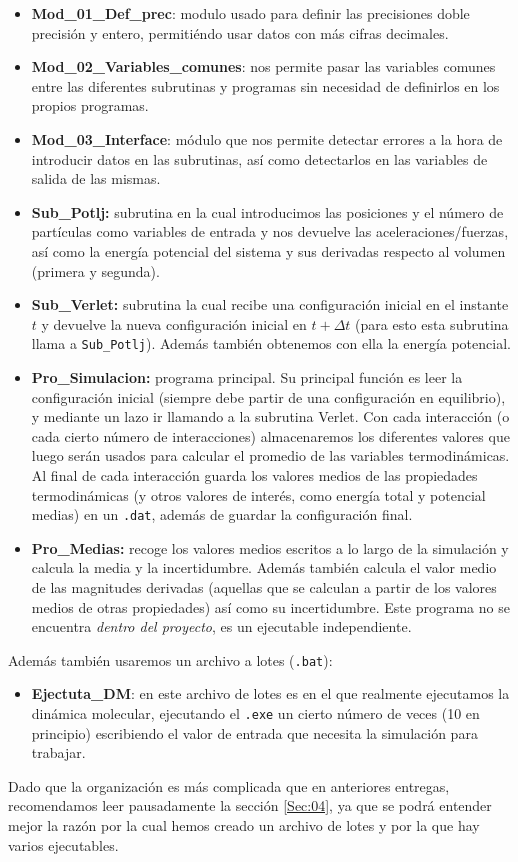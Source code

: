 \documentclass[11pt]{article} %
\begin{document}
\begin{itemize}
	\item \textbf{Mod\_01\_Def\_prec}: modulo usado para definir las precisiones doble precisión y entero, permitiéndo usar datos con más cifras decimales.
	\item \textbf{Mod\_02\_Variables\_comunes}: nos permite pasar las variables comunes entre las diferentes subrutinas y programas sin necesidad de definirlos en los propios programas.
	\item \textbf{Mod\_03\_Interface}: módulo que nos permite detectar errores a la hora de introducir datos en las subrutinas, así como detectarlos en las variables de salida de las mismas.
	\item \textbf{Sub\_Potlj:} subrutina en la cual introducimos las posiciones y el número de partículas como variables de entrada y nos devuelve las aceleraciones/fuerzas, así como la energía potencial del sistema y sus derivadas respecto al volumen (primera y segunda).
	\item \textbf{Sub\_Verlet:} subrutina la cual recibe una configuración inicial en el instante $t$ y devuelve la nueva configuración inicial en $t+\Delta t$ (para esto esta subrutina llama a \texttt{Sub\_Potlj}). Además también obtenemos con ella la energía potencial.
	\item \textbf{Pro\_Simulacion:} programa principal. Su principal función es leer la configuración inicial (siempre debe partir de una configuración en equilibrio), y mediante un lazo ir llamando a la subrutina Verlet. Con cada interacción (o cada cierto número de interacciones) almacenaremos los diferentes valores que luego serán usados para calcular el promedio de las variables termodinámicas. Al final de cada interacción guarda los valores medios de las propiedades termodinámicas (y otros valores de interés, como energía total y potencial medias) en un \texttt{.dat}, además de guardar la configuración final.
	\item \textbf{Pro\_Medias:} recoge los valores medios escritos a lo largo de la simulación y calcula la media y la incertidumbre. Además también calcula el valor medio de las magnitudes derivadas (aquellas que se calculan a partir de los valores medios de otras propiedades) así como su incertidumbre. Este programa no se encuentra \textit{dentro del proyecto}, es un ejecutable independiente.
\end{itemize}
Además también usaremos un archivo a lotes (\texttt{.bat}):

\begin{itemize}
	\item \textbf{Ejectuta\_DM}: en este archivo de lotes es en el que realmente ejecutamos la dinámica molecular, ejecutando el \texttt{.exe} un cierto número de veces (10 en principio) escribiendo el valor de entrada que necesita la simulación para trabajar.
\end{itemize}
Dado que la organización es más complicada que en anteriores entregas, recomendamos leer pausadamente la sección \ref{Sec:04}, ya que se podrá entender mejor la razón por la cual hemos creado un archivo de lotes y por la que hay varios ejecutables.
\end{document}
